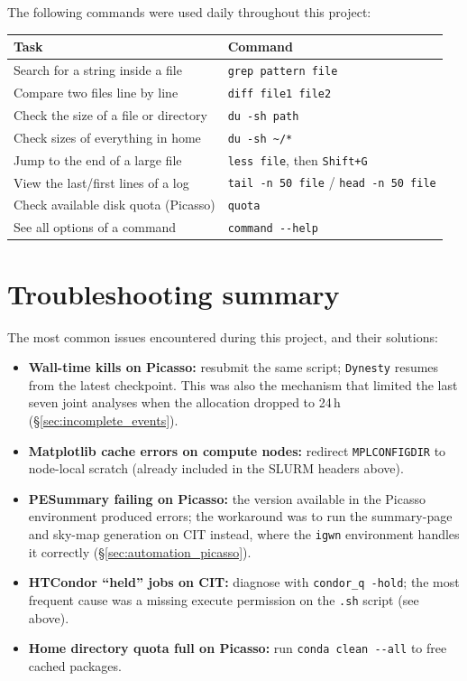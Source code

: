 The following commands were used daily throughout this project:

\begin{center}
\renewcommand{\arraystretch}{1.2}
\begin{tabular}{ll}
\hline\hline
\textbf{Task} & \textbf{Command} \\
\hline
Search for a string inside a file & \texttt{grep pattern file} \\
Compare two files line by line & \texttt{diff file1 file2} \\
Check the size of a file or directory & \texttt{du -sh path} \\
Check sizes of everything in home & \texttt{du -sh \textasciitilde/*} \\
Jump to the end of a large file & \texttt{less file}, then \texttt{Shift+G} \\
View the last/first lines of a log & \texttt{tail -n 50 file} / \texttt{head -n 50 file} \\
Check available disk quota (Picasso) & \texttt{quota} \\
See all options of a command & \texttt{command -{}-help} \\
\hline
\end{tabular}
\end{center}

\section{Troubleshooting summary}

The most common issues encountered during this project, and their solutions:

\begin{itemize}
  \item \textbf{Wall-time kills on Picasso:} resubmit the same script; \texttt{Dynesty} resumes from the latest checkpoint. This was also the mechanism that limited the last seven joint analyses when the allocation dropped to 24\,h (\S\ref{sec:incomplete_events}).
  \item \textbf{Matplotlib cache errors on compute nodes:} redirect \texttt{MPLCONFIGDIR} to node-local scratch (already included in the SLURM headers above).
  \item \textbf{PESummary failing on Picasso:} the version available in the Picasso environment produced errors; the workaround was to run the summary-page and sky-map generation on CIT instead, where the \texttt{igwn} environment handles it correctly (\S\ref{sec:automation_picasso}).
  \item \textbf{HTCondor ``held'' jobs on CIT:} diagnose with \texttt{condor\_q -hold}; the most frequent cause was a missing execute permission on the \texttt{.sh} script (see above).
  \item \textbf{Home directory quota full on Picasso:} run \texttt{conda clean -{}-all} to free cached packages.
\end{itemize}

